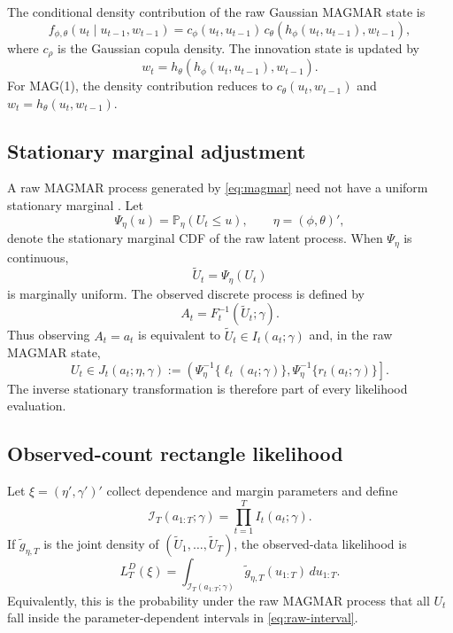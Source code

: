 \documentclass[11pt]{article}
\theoremstyle{definition}
\newcommand{\Pp}{\mathbb{P}}
\begin{document}
The conditional density contribution of the raw Gaussian MAGMAR state is
\begin{equation}
f_{\phi,\theta}(u_t\mid u_{t-1},w_{t-1})
=
c_\phi(u_t,u_{t-1})\,
c_\theta\!\left(h_\phi(u_t,u_{t-1}),w_{t-1}\right),
\label{eq:magmar-density}
\end{equation}
where $c_\rho$ is the Gaussian copula density. The innovation state is updated by
\[
w_t=h_\theta\!\left(h_\phi(u_t,u_{t-1}),w_{t-1}\right).
\]
For MAG(1), the density contribution reduces to $c_\theta(u_t,w_{t-1})$ and
$w_t=h_\theta(u_t,w_{t-1})$.

\subsection{Stationary marginal adjustment}

A raw MAGMAR process generated by \eqref{eq:magmar} need not have a uniform
stationary marginal \citep{pappert2026mag}. Let
\begin{equation}
\Psi_{\eta}(u)=\Pp_\eta(U_t\le u),
\qquad
\eta=(\phi,\theta)',
\label{eq:psi}
\end{equation}
denote the stationary marginal CDF of the raw latent process. When $\Psi_\eta$ is
continuous,
\begin{equation}
\widetilde U_t=\Psi_\eta(U_t)
\label{eq:uniform-adjust}
\end{equation}
is marginally uniform. The observed discrete process is defined by
\begin{equation}
A_t=F_t^{-1}(\widetilde U_t;\gamma).
\label{eq:obs-map}
\end{equation}
Thus observing $A_t=a_t$ is equivalent to
$\widetilde U_t\in I_t(a_t;\gamma)$ and, in the raw MAGMAR state,
\begin{equation}
U_t\in
J_t(a_t;\eta,\gamma)
:=
\left(
\Psi_\eta^{-1}\{\ell_t(a_t;\gamma)\},
\Psi_\eta^{-1}\{r_t(a_t;\gamma)\}
\right].
\label{eq:raw-interval}
\end{equation}
The inverse stationary transformation is therefore part of every likelihood
evaluation.

\subsection{Observed-count rectangle likelihood}
\label{subsec:exact-likelihood}

Let $\xi=(\eta',\gamma')'$ collect dependence and margin parameters and define
\[
\mathcal I_T(a_{1:T};\gamma)=\prod_{t=1}^T I_t(a_t;\gamma).
\]
If $\widetilde g_{\eta,T}$ is the joint density of
$(\widetilde U_1,\ldots,\widetilde U_T)$, the observed-data likelihood is
\begin{equation}
L_T^D(\xi)
=
\int_{\mathcal I_T(a_{1:T};\gamma)}
\widetilde g_{\eta,T}(u_{1:T})\,du_{1:T}.
\label{eq:exact-lik}
\end{equation}
Equivalently, this is the probability under the raw MAGMAR process that all $U_t$
fall inside the parameter-dependent intervals in \eqref{eq:raw-interval}.
\end{document}
